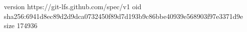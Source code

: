version https://git-lfs.github.com/spec/v1
oid sha256:6941d8ec89d2d9dca0732450f89d7d193b9c86bbe40939e568903f97e3371d9e
size 174936
